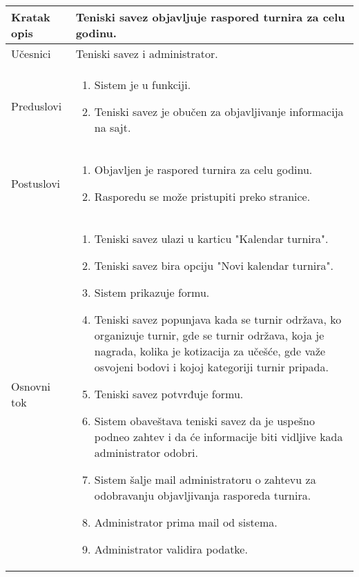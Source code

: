 \documentclass{article}
\begin{document}
    \begin{longtable}{| p{} | p{} |} 
        \hline
            Kratak opis & Teniski savez objavljuje raspored turnira za celu godinu.\\ 
        \hline    
            Učesnici & Teniski savez i administrator.\\
        \hline
            Preduslovi & 
                \begin{enumerate}
                    \item Sistem je u funkciji.
                    \item Teniski savez je obučen za objavljivanje informacija na sajt.
                \end{enumerate}\\
        \hline  
            Postuslovi & 
                \begin{enumerate}
                    \item Objavljen je raspored turnira za celu godinu.
                    \item Rasporedu se može pristupiti preko stranice.
                \end{enumerate}\\
        \hline
            Osnovni tok & 
                \begin{enumerate}
                    \item Teniski savez ulazi u karticu "Kalendar turnira".
                    \item Teniski savez bira opciju "Novi kalendar turnira".
                    \item Sistem prikazuje formu.
                    \item Teniski savez popunjava kada se turnir održava, ko organizuje turnir, gde se turnir održava, koja je nagrada, kolika je kotizacija za učešće, gde važe osvojeni bodovi i kojoj kategoriji turnir pripada. 
                    \item Teniski savez potvrđuje formu.
                    \item Sistem obaveštava teniski savez da je uspešno podneo zahtev i da će informacije biti vidljive kada administrator odobri.
                    \item Sistem šalje mail administratoru o zahtevu za odobravanju objavljivanja rasporeda turnira.
                    \item Administrator prima mail od sistema.
                    \item Administrator validira podatke.

\end{enumerate}
\end{longtable}
\end{document}
